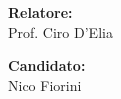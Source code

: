 \vspace{20mm}


\begin{minipage}[t]{0.47\textwidth}
	{\normalsize{\textbf{Relatore:}}{\normalsize\vspace{3mm}
	\\ \large{Prof. Ciro D'Elia}}}
\end{minipage}
\hfill
\begin{minipage}[t]{0.47\textwidth}\raggedleft
	{\normalsize{\textbf{Candidato:}}{\normalsize\vspace{3mm} 
        \\ \large{Nico Fiorini}}}
\end{minipage}


\vspace{30mm}


{\par}



